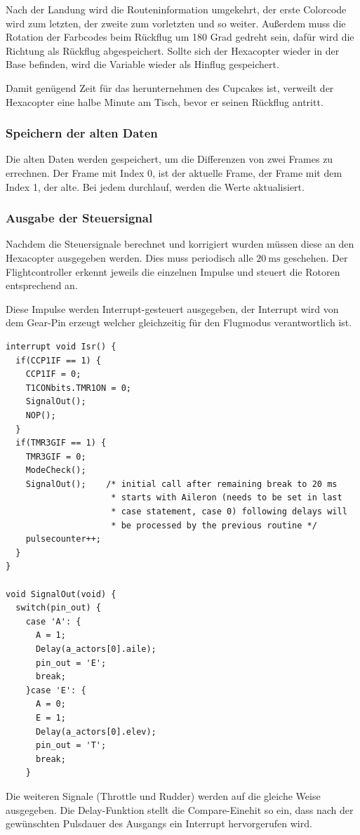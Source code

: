     Nach der Landung wird die Routeninformation umgekehrt, der erste Colorcode wird zum letzten, der zweite zum vorletzten und so weiter. Außerdem muss die Rotation der Farbcodes beim Rückflug um 180 Grad gedreht sein, dafür wird die Richtung als Rückflug abgespeichert. Sollte sich der Hexacopter wieder in der Base befinden, wird die Variable wieder als Hinflug gespeichert.

    Damit genügend Zeit für das herunternehmen des Cupcakes ist, verweilt der Hexacopter eine halbe Minute am Tisch, bevor er seinen Rückflug antritt.

    \subsubsection{Speichern der alten Daten}
    Die alten Daten werden gespeichert, um die Differenzen von zwei Frames zu errechnen. Der Frame mit Index 0, ist der aktuelle Frame, der Frame mit dem Index 1, der alte. Bei jedem durchlauf, werden die Werte aktualisiert.

    \subsubsection{Ausgabe der Steuersignal}
    Nachdem die Steuersignale berechnet und korrigiert wurden müssen diese an den Hexacopter ausgegeben werden. Dies muss periodisch alle $\SI{20}{\milli\second}$ geschehen.
    Der Flightcontroller erkennt jeweils die einzelnen Impulse und steuert die Rotoren entsprechend an.

    Diese Impulse werden Interrupt-gesteuert ausgegeben, der Interrupt wird von dem Gear-Pin erzeugt welcher gleichzeitig für den Flugmodus verantwortlich ist.

    \lstset{language = c}
    \begin{lstlisting}
interrupt void Isr() {
  if(CCP1IF == 1) {
    CCP1IF = 0;
    T1CONbits.TMR1ON = 0;
    SignalOut();
    NOP();
  }
  if(TMR3GIF == 1) {
    TMR3GIF = 0;
    ModeCheck();
    SignalOut();    /* initial call after remaining break to 20 ms
                     * starts with Aileron (needs to be set in last
                     * case statement, case 0) following delays will
                     * be processed by the previous routine */
    pulsecounter++;
  }
}

void SignalOut(void) {
  switch(pin_out) {
    case 'A': {
      A = 1;
      Delay(a_actors[0].aile);
      pin_out = 'E';
      break;
    }case 'E': {
      A = 0;
      E = 1;
      Delay(a_actors[0].elev);
      pin_out = 'T';
      break;
    }
    \end{lstlisting}
    Die weiteren Signale (Throttle und Rudder) werden auf die gleiche Weise ausgegeben.
    Die Delay-Funktion stellt die Compare-Einehit so ein, dass nach der gewünschten Pulsdauer des Ausgangs ein Interrupt hervorgerufen wird.

